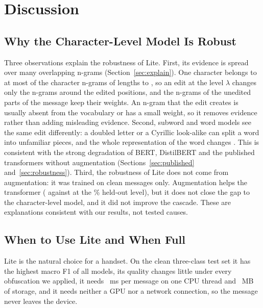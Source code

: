 \section{Discussion}\label{sec:discussion}

\subsection{Why the Character-Level Model Is Robust}\label{sec:why}

Three observations explain the robustness of Lite. First, its evidence is spread over many overlapping n-grams (Section~\ref{sec:explain}). One character belongs to at most  of the character n-grams of lengths  to , so an edit at the level $\lambda$ changes only the n-grams around the edited positions, and the n-grams of the unedited parts of the message keep their weights. An n-gram that the edit creates is usually absent from the vocabulary or has a small weight, so it removes evidence rather than adding misleading evidence. Second, subword and word models see the same edit differently: a doubled letter or a Cyrillic look-alike can split a word into unfamiliar pieces, and the whole representation of the word changes \cite{pruthi2019,boucher2022}. This is consistent with the strong degradation of BERT, DistilBERT and the published transformers without augmentation (Sections~\ref{sec:published} and~\ref{sec:robustness}). Third, the robustness of Lite does not come from augmentation: it was trained on clean messages only. Augmentation helps the transformer ( against  at the \% held-out level), but it does not close the gap to the character-level model, and it did not improve the cascade. These are explanations consistent with our results, not tested causes.

\subsection{When to Use Lite and When Full}\label{sec:when}

Lite is the natural choice for a handset. On the clean three-class test set it has the highest macro F1 of all models, its quality changes little under every obfuscation we applied, it needs ~ms per message on one CPU thread and ~MB of storage, and it needs neither a GPU nor a network connection, so the message never leaves the device.

